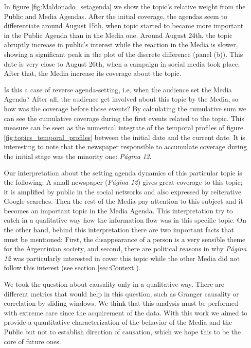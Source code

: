 \documentclass[a4paper, 12pt]{article}
\begin{document}
\par In figure \ref{fig:Maldonado_setagenda} we show the topic's relative weight from the Public and Media Agendas.  After the initial coverage, the agendas seem to differentiate around August 15th, when topic started to became more important in the Public Agenda than in the Media one. Around August 24th, the topic abruptly increase in public's interest while the reaction in the Media is slower, showing a significant peak in the plot of the discrete difference (panel (b)). This date is very close to August 26th, when a campaign in social media took place. After that, the Media increase its coverage about the topic. 

\par Is this a case of reverse agenda-setting, i.e, when the audience set the Media Agenda? 
After all,  the audience get involved about this topic by the Media, so how was the coverage before those events?
By calculating the cumulative sum we can see  the cumulative coverage during the first events related to the topic. 
This measure can be seen as the numerical integrate of the temporal profiles of figure \ref{fig:topics_temporal_profiles} between the initial date and the current date. 
It is interesting to note that the newspaper responsible to accumulate coverage during the initial stage was the minority one: \emph{P\'agina 12}. 

Our interpretation about the setting agenda dynamics of this particular topic is the following: A small newspaper (\emph{P\'agina 12}) gives great coverage to this topic; it is amplified  by public in the social networks and also expressed  by reiterative Google searches. Then the rest of the Media  pay attention to this subject and it becomes an important topic in the Media Agenda. 
This interpretation try to catch in a qualitative way how the information flow was in this specific topic.
On the other hand, behind this interpretation there are two important facts that must be mentioned: First, the disappearance of a person is a very sensible theme for the Argentinian society, and second, there are political reasons in why \emph{P\'agina 12} was particularly interested in cover this topic while the other Media did not follow this interest (see section \ref{sec:Context}).

\par We took the question about causality only in a qualitative way. 
There are different metrics that would help in this question, such as Granger causality or correlation by sliding windows. We think that this analysis must be performed with extreme care since the acquirement of the data.
With this work we aimed to provide a quantitative characterization of the behavior of the Media and the Public but not to establish direction of causation, which we hope this to be the core of future ones.
\end{document}
